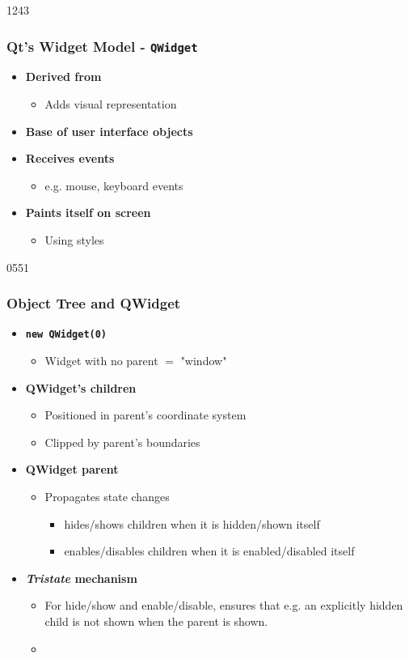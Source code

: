 \begin{slide}{1243}
  \frametitle{Qt's Widget Model - \texttt{QWidget}}
  \begin{itemize}
 \item \textbf{Derived from }
    \begin{itemize}
    \item Adds visual representation
    \end{itemize}
  \item \textbf{Base of user interface objects}
  \item \textbf{Receives events}
    \begin{itemize}
    \item e.g. mouse, keyboard events
    \end{itemize}
  \item \textbf{Paints itself on screen}
    \begin{itemize}
    \item Using styles
    \end{itemize}
\end{itemize}
\end{slide}


\begin{slide}[fragile]{0551}\frametitle{Object Tree and QWidget}
  \begin{itemize}
  \item \textbf{\texttt{new QWidget(0)}}
    \begin{itemize}
    \item Widget with no parent $=$ "window"
    \end{itemize}
  \item \textbf{QWidget's children}
    \begin{itemize}
    \item Positioned in parent's coordinate system
    \item Clipped by parent's boundaries
    \end{itemize}
  \item \textbf{QWidget parent }
    \begin{itemize}
    \item Propagates state changes
      \begin{itemize}
      \item hides/shows children when it is hidden/shown itself
      \item enables/disables children when it is enabled/disabled itself
      \end{itemize}
    \end{itemize}
  \item \textbf{\textit{Tristate} mechanism}
    \begin{itemize}
      \item For hide/show and enable/disable, ensures that e.g. an
        explicitly hidden child is not shown when the parent is shown.
      \item {}
      \end{itemize}
 \end{itemize}
\end{slide}

